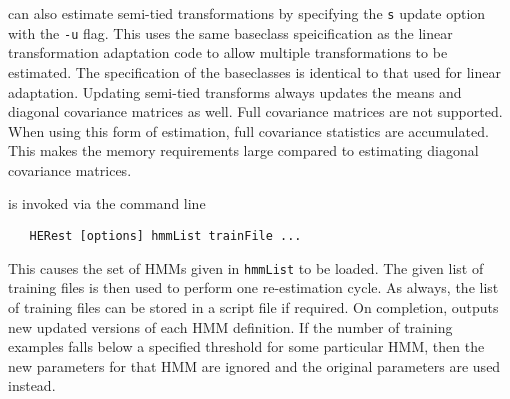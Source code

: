  can also estimate semi-tied transformations by
specifying the {\tt s} update option with the {\tt -u} flag. This uses the same baseclass
speicification as the linear transformation adaptation code to allow
multiple transformations to be estimated. The specification of the
baseclasses is identical to that used for linear adaptation. Updating
semi-tied transforms always updates the means and diagonal covariance
matrices as well.  Full covariance matrices are not supported. When
using this form of estimation, full covariance statistics are
accumulated. This makes the memory requirements large compared to
estimating diagonal covariance matrices.


 is invoked via the command line
\begin{verbatim}
   HERest [options] hmmList trainFile ...
\end{verbatim}
This causes the set of HMMs given in {\tt hmmList} to be loaded.
The given list of
training files is then used to perform one re-estimation cycle. As always,
the list of training files can be stored in a script file if required.  On
completion,  outputs new updated versions of each HMM definition. If
the number of training examples falls below a specified threshold 
for some particular HMM, then
the new parameters for that HMM are ignored and the original parameters are used 
instead.

